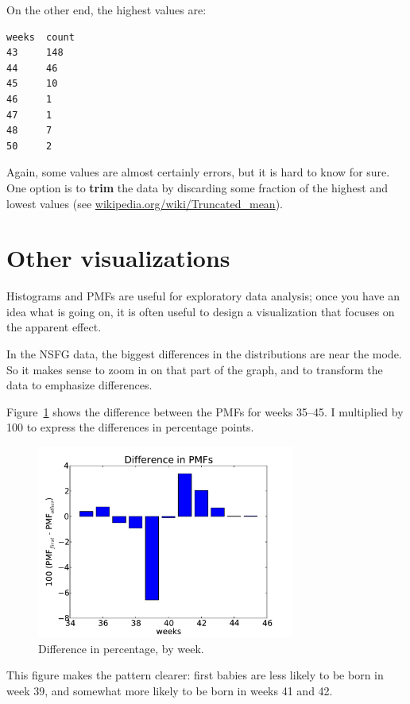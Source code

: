 \documentclass[12pt]{book}
\begin{document}
On the other end, the highest values are:
%
\begin{verbatim}
weeks  count
43     148
44     46
45     10
46     1
47     1
48     7
50     2
\end{verbatim}

Again, some values are almost certainly errors,
but it is hard to know for sure.  One option is to {\bf trim} the data
by discarding some fraction of the highest and lowest values (see
\url{wikipedia.org/wiki/Truncated_mean}).


\section{Other visualizations}

Histograms and PMFs are useful for exploratory data analysis;
once you have an idea what is going on, it is often useful to
design a visualization that focuses on the apparent effect.

In the NSFG data, the biggest differences in the distributions are
near the mode.  So it makes sense to zoom in on that part of the
graph, and to transform the data to emphasize differences.

Figure~\ref{nsfg_diffs} shows the difference between the PMFs for weeks
35--45.  I multiplied by 100 to express the differences in percentage
points.

\begin{figure}
\centerline{\includegraphics[height=2.5in]{figs/nsfg_diffs.pdf}}
\caption{Difference in percentage, by week.}
\label{nsfg_diffs}
\end{figure}

This figure makes the pattern clearer: first babies are
less likely to be born in week 39, and somewhat more likely
to be born in weeks 41 and 42.
\end{document}
